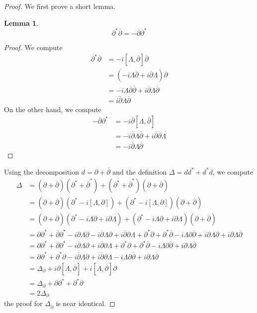 \documentclass[psamsfonts, 12pt]{amsart}
\newtheorem{lem}[thm]{Lemma}
\theoremstyle{definition}
\theoremstyle{remark}
\newcommand{\dbar}{\overline{\partial}}
\begin{document}
\begin{proof}
We first prove a short lemma.
\begin{lem}
\[
\partial^*\dbar = -\dbar\partial^*
\]
\end{lem}
%
\begin{proof}
We compute
\begin{align*}
\partial^*\dbar &= -i[\Lambda,\dbar]\dbar \\
&= (-i\Lambda\dbar + i\dbar\Lambda)\dbar \\
&= -i\Lambda\dbar\dbar + i\dbar\Lambda\dbar \\
&= i\dbar\Lambda\dbar
\end{align*}
On the other hand, we compute
\begin{align*}
-\dbar\partial^* &= -i\dbar[\Lambda,\dbar] \\
&= -i\dbar\Lambda\dbar + i\dbar\dbar\Lambda \\
&= -i\dbar\Lambda\dbar
\end{align*}
\end{proof}
Using the decomposition $d = \partial + \dbar$ and the definition $\Delta = dd^* +d^*d$,
we compute
\begin{align*}
\Delta &= (\partial + \dbar)(\partial^* + \dbar^*)
+ (\partial^* + \dbar^*)(\partial + \dbar) \\
&= (\partial + \dbar)(\partial^* - i[\Lambda,\partial])
+ (\partial^* -i[\Lambda,\partial])(\partial + \dbar) \\
&= (\partial + \dbar)(\partial^* - i\Lambda\partial +i\partial\Lambda)
+ (\partial^* - i\Lambda\partial +i\partial\Lambda)(\partial + \dbar) \\
&= \partial\partial^* + \dbar\partial^* -i\partial\Lambda\partial -i\dbar\Lambda\partial
+i\dbar\partial\Lambda + \partial^*\partial + \partial^*\dbar -i\Lambda\partial\dbar
+i\partial\Lambda\partial +i\partial\Lambda\dbar \\
&= \partial\partial^* + \dbar\partial^* -i\dbar\Lambda\partial + i\dbar\partial\Lambda
+\partial^*\partial + \partial^*\dbar -i\Lambda\partial\dbar + i\partial\Lambda\dbar \\
&= \partial\partial^* +\partial^*\partial -i\dbar\Lambda\partial
+ i\dbar\partial\Lambda -i\Lambda\partial\dbar + i\partial\Lambda\dbar \\
&= \Delta_\partial + i\partial[\Lambda,\dbar] + i[\Lambda,\dbar]\partial \\
&= \Delta_{\partial} + \partial\partial^* + \partial^*\partial \\
&= 2\Delta_{\partial}
\end{align*}
the proof for $\Delta_{\dbar}$ is near identical.
\end{proof}
\end{document}
